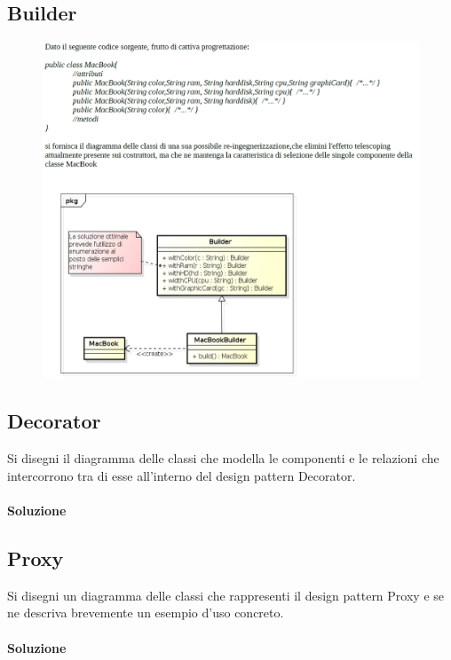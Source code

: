\subsection{Builder}

\begin{figure}[H]\center
\includegraphics[width=1\textwidth]{res/img/Esercizi/es-builder}
\end{figure}

\subsection{Decorator}

Si disegni il diagramma delle classi che modella le componenti e le relazioni che intercorrono tra di esse all'interno del design pattern Decorator.

\paragraph{Soluzione}

\subsection{Proxy}

Si disegni un diagramma delle classi che rappresenti il design pattern Proxy e se ne descriva brevemente un esempio
d'uso concreto.

\paragraph{Soluzione}


